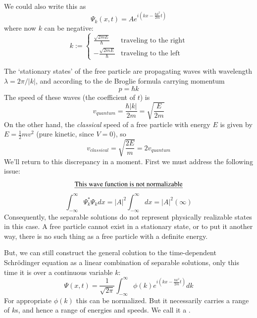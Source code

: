 \documentclass[12pt, a4paper, oneside, openright, titlepage]{book}
\begin{document}
We could also write this as \begin{equation*}
    \Psi_k(x,t) = Ae^{i\left(kx - \frac{\hbar k^2}{2m}t\right)}
\end{equation*}
where now $k$ can be negative: \begin{equation*}
    k := \left\{\begin{array}{cc} \frac{\sqrt{2mE}}{\hbar} & \text{traveling to the right} \\ -\frac{\sqrt{2mE}}{\hbar} & \text{traveling to the left} \end{array}\right.
\end{equation*}

The `stationary states' of the free particle are propagating waves with wavelength $\lambda = 2\pi/|k|$, and according to the de Broglie formula carrying momentum $$p = \hbar k$$
The speed of these waves (the coefficient of $t$) is \begin{equation*}
    \boxed{v_{quantum} = \frac{\hbar|k|}{2m} = \sqrt{\frac{E}{2m}}}
\end{equation*}
On the other hand, the \emph{classical} speed of a free particle with energy $E$ is given by $E = \frac{1}{2}mv^2$ (pure kinetic, since $V = 0$), so $$v_{classical} = \sqrt{\frac{2E}{m}} = 2v_{quantum}$$
We'll return to this discrepancy in a moment. First we must address the following issue:
\begin{equation*}
    \text{\emph{This wave function is not normalizable}}
\end{equation*}
\begin{equation*}
    \int_{-\infty}^{\infty}\Psi^*_k\Psi_kdx = |A|^2\int_{-\infty}^{\infty}dx = |A|^2(\infty)
\end{equation*}
Consequently, the separable solutions do not represent physically realizable states in this case. A free particle cannot exist in a stationary state, or to put it another way, there is no such thing as a free particle with a definite energy.

But, we can still construct the general colution to the time-dependent Schr\"{o}dinger equation as a linear combination of separable solutions, only this time it is over a continuous variable $k$:\begin{equation*}
    \boxed{\Psi(x,t) = \frac{1}{\sqrt{2\pi}}\int_{-\infty}^{\infty}\phi(k)e^{i\left(kx-\frac{\hbar k^2}{2m}t\right)}dk}
\end{equation*}
For appropriate $\phi(k)$ this can be normalized. But it necessarily carries a range of $k$s, and hence a range of energies and speeds. We call it a .
\end{document}
